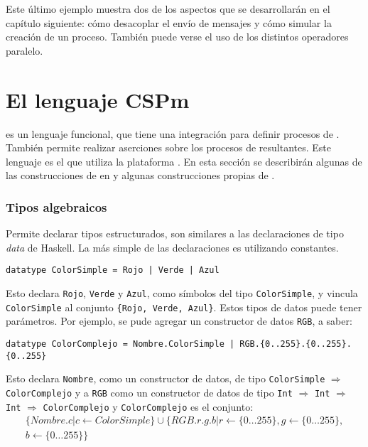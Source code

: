 Este último ejemplo muestra dos de los aspectos que se desarrollarán en el capítulo siguiente: cómo desacoplar el envío de mensajes y cómo simular la creación de un proceso. También puede verse el uso de los distintos operadores paralelo.
 
\section{El lenguaje CSPm}

\CSPm es un lenguaje funcional, que tiene una integración para definir procesos de \CSP. También permite realizar aserciones sobre los procesos de \CSP resultantes. Este lenguaje es el que utiliza la plataforma \FDR. En esta sección se describirán algunas de las construcciones de \CSP en \CSPm y algunas construcciones propias de \CSPm.

\subsubsection{Tipos algebraicos}

Permite declarar tipos estructurados, son similares a las declaraciones de tipo \textit{data} de Haskell. La más simple de las declaraciones es utilizando constantes.

\begin{verbatim}
datatype ColorSimple = Rojo | Verde | Azul
\end{verbatim}

Esto declara \verb=Rojo=, \verb=Verde= y \verb=Azul=, como símbolos del tipo \verb=ColorSimple=, y vincula \verb=ColorSimple= al conjunto \verb={Rojo, Verde, Azul}=. Estos tipos de datos puede tener parámetros. Por ejemplo, se pude agregar un constructor de datos \verb=RGB=, a saber:

\begin{verbatim}
datatype ColorComplejo = Nombre.ColorSimple | RGB.{0..255}.{0..255}.{0..255}
\end{verbatim}

Esto declara \verb=Nombre=, como un constructor de datos, de tipo \verb=ColorSimple= $\Rightarrow$ \verb$ColorComplejo$ y a \verb$RGB$ como un constructor de datos de tipo \verb$Int$ $\Rightarrow$ \verb$Int$ $\Rightarrow$ \verb$Int$ $\Rightarrow$ \verb$ColorComplejo$ y \verb$ColorComplejo$ es el conjunto:
\begin{multline*}
\{ Nombre.c | c \leftarrow  ColorSimple \} \cup \{ RGB.r.g.b |  r \leftarrow \{ 0 \dots 255 \},  g \leftarrow \{ 0 \dots 255 \}, \\  b \leftarrow \{ 0 \dots 255 \} \}  
\end{multline*}


